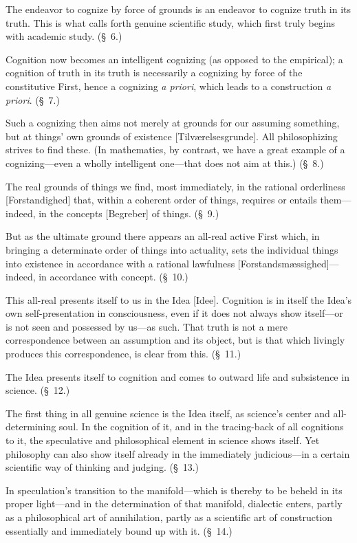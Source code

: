 \documentclass[12pt,a4paper]{book}
\begin{document}
The endeavor to cognize by force of grounds is an endeavor to cognize truth in
its truth. This is what calls forth genuine scientific study, which first truly
begins with academic study. (\S~6.)

Cognition now becomes an intelligent cognizing (as opposed to the empirical); a
cognition of truth in its truth is necessarily a cognizing by force of the
constitutive First, hence a cognizing \textit{a priori}, which leads to a
construction \textit{a priori}. (\S~7.)

Such a cognizing then aims not merely at grounds for our assuming something, but
at things' own grounds of existence [Tilværelsesgrunde]. All philosophizing
strives to find these. (In mathematics, by contrast, we have a great example of
a cognizing---even a wholly intelligent one---that does not aim at this.)
(\S~8.)

The real grounds of things we find, most immediately, in the rational
orderliness [Forstandighed] that, within a coherent order of things, requires or
entails them---indeed, in the concepts [Begreber] of things. (\S~9.)

But as the ultimate ground there appears an all-real active First which, in
bringing a determinate order of things into actuality, sets the individual
things into existence in accordance with a rational lawfulness
[Forstandsmæssighed]---indeed, in accordance with concept. (\S~10.)

This all-real presents itself to us in the Idea [Idee]. Cognition is in itself
the Idea's own self-presentation in consciousness, even if it does not always
show itself---or is not seen and possessed by us---as such. That truth is not a
mere correspondence between an assumption and its object, but is that which
livingly produces this correspondence, is clear from this. (\S~11.)

The Idea presents itself to cognition and comes to outward life and subsistence
in science. (\S~12.)

The first thing in all genuine science is the Idea itself, as science's center
and all-determining soul. In the cognition of it, and in the tracing-back of
all cognitions to it, the speculative and philosophical element in science shows
itself. Yet philosophy can also show itself already in the immediately
judicious---in a certain scientific way of thinking and judging. (\S~13.)

In speculation's transition to the manifold---which is thereby to be beheld in
its proper light---and in the determination of that manifold, dialectic enters,
partly as a philosophical art of annihilation, partly as a scientific art of
construction essentially and immediately bound up with it. (\S~14.)
\end{document}
